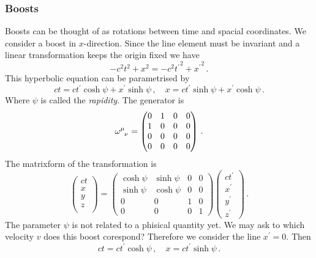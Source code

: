 \subsubsection*{Boosts}
Boosts can be thought of as rotations between time and spacial coordinates. We
consider a boost in $x$-direction. Since the line element must be invariant and
a linear transformation keeps the origin fixed we have
\begin{equation}
  -c^2t^2+x^2=-c^2{t^\prime}^2+{x^\prime}^2\, .
  \end{equation}
  This hyperbolic equation can be parametrised by
  \begin{equation}
  ct = ct^\prime\cosh\psi+x^\prime\sinh\psi\,, \quad x =
  ct^\prime\sinh\psi+x^\prime\cosh\psi\, .
  \end{equation}
  Where $\psi$ is called the \emph{rapidity}. 
  The generator is 
  \begin{equation}
  \tensor{\omega}{^\mu_\nu}
  =\begin{pmatrix}
  0&1 & 0&0\\
  1&0 &0&0\\
  0&0&0 &0\\
  0&0 &0 &0
  \end{pmatrix}\,.
  \end{equation}
  The matrixform of the transformation is
  \begin{equation}
  \begin{pmatrix}
  ct\\
  x\\
  y\\
  z\\
  \end{pmatrix}=
  \begin{pmatrix}
  \cosh\psi&\sinh\psi & 0&0\\
  \sinh\psi&\cosh\psi &0&0\\
  0&0&1 &0\\
  0&0 &0 &1
  \end{pmatrix}
  \begin{pmatrix}
  ct^\prime\\
  x^\prime\\
  y^\prime\\
  z^\prime
  \end{pmatrix}\, .
  \end{equation}
  The parameter $\psi$ is not related to a phisical quantity yet. We may ask to which 
  velocity $v$ does this boost corespond? 
  Therefore we consider the line $x^\prime= 0$.
  Then
  \begin{equation}
  ct=ct^\prime\cosh\psi\, ,\quad
  x=ct^\prime\sinh\psi\, .
  \end{equation}
